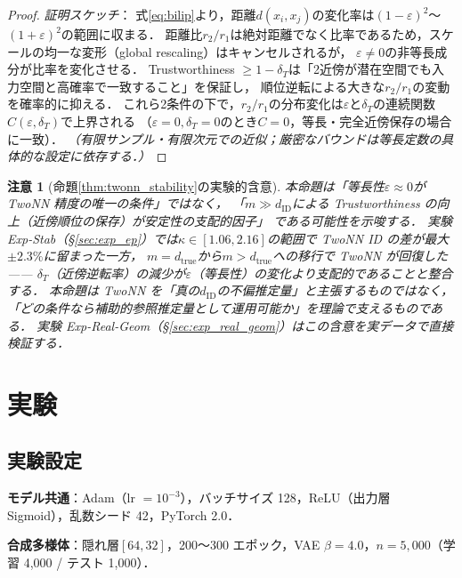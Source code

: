 \documentclass[11pt,a4paper]{jsarticle}
\newtheorem{remark}{注意}
\newcommand{\kap}{\kappa}
\begin{document}
\begin{proof}
\textit{証明スケッチ}：
式\eqref{eq:bilip}より，距離$d(x_i, x_j)$の変化率は$(1-\varepsilon)^2$〜$(1+\varepsilon)^2$の範囲に収まる．
距離比$r_2/r_1$は絶対距離でなく比率であるため，スケールの均一な変形（global rescaling）はキャンセルされるが，
$\varepsilon \neq 0$の非等長成分が比率を変化させる．
Trustworthiness $\geq 1-\delta_T$は「2近傍が潜在空間でも入力空間と高確率で一致すること」を保証し，
順位逆転による大きな$r_2/r_1$の変動を確率的に抑える．
これら2条件の下で，$r_2/r_1$の分布変化は$\varepsilon$と$\delta_T$の連続関数$C(\varepsilon,\delta_T)$で上界される
（$\varepsilon=0, \delta_T=0$のとき$C=0$，等長・完全近傍保存の場合に一致）．
\textit{（有限サンプル・有限次元での近似；厳密なバウンドは等長定数の具体的な設定に依存する．）}
\end{proof}

\begin{remark}[命題\ref{thm:twonn_stability}の実験的含意]
本命題は「等長性$\varepsilon \approx 0$が TwoNN 精度の唯一の条件」ではなく，
「$m \gg d_\mathrm{ID}$による Trustworthiness の向上（近傍順位の保存）が安定性の支配的因子」
である可能性を示唆する．
実験 Exp-Stab（§\ref{sec:exp_ep}）では$\kap \in [1.06, 2.16]$の範囲で TwoNN ID の差が最大$\pm 2.3\%$に留まった一方，
$m = d_\mathrm{true}$から$m > d_\mathrm{true}$への移行で TwoNN が回復した——
$\delta_T$（近傍逆転率）の減少が$\varepsilon$（等長性）の変化より支配的であることと整合する．
本命題は TwoNN を「真の$d_\mathrm{ID}$の不偏推定量」と主張するものではなく，
「どの条件なら補助的参照推定量として運用可能か」を理論で支えるものである．
実験 Exp-Real-Geom（§\ref{sec:exp_real_geom}）はこの含意を実データで直接検証する．
\end{remark}

\section{実験}\label{sec:exp}

\subsection{実験設定}\label{sec:exp_setup}

\textbf{モデル共通}：Adam（lr $= 10^{-3}$），バッチサイズ 128，ReLU（出力層 Sigmoid），乱数シード 42，PyTorch 2.0．

\textbf{合成多様体}：隠れ層$[64, 32]$，200〜300 エポック，VAE $\beta = 4.0$，$n = 5{,}000$（学習 4,000 / テスト 1,000）．
\end{document}
